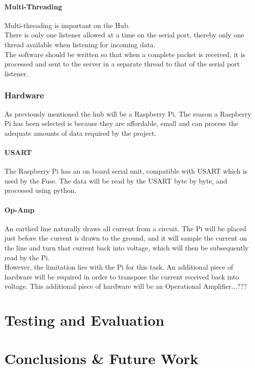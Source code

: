 \documentclass[draft,preprint,12pt,3p]{elsarticle}
\begin{document}
\paragraph{Multi-Threading}
Multi-threading is important on the Hub.\\
There is only one listener allowed at a time on the serial port, thereby only one thread available when listening for incoming data.\\
The software should be written so that when a complete packet is received, it is processed and sent to the server in a separate thread to that of the serial port listener.
\subsubsection{Hardware}
As previously mentioned the hub will be a Raspberry Pi. The reason a Raspberry Pi has been selected is because they are affordable, small and can process the adequate amounts of data required by the project.
\paragraph{USART}
The Raspberry Pi has an on board serial unit, compatible with USART which is used by the Fuse. The data will be read by the USART byte by byte, and processed using python.\\
\paragraph{Op-Amp}
An earthed line naturally draws all current from a circuit. The Pi will be placed just before the current is drawn to the ground, and it will sample the current on the line and turn that current back into voltage, which will then be subsequently read by the Pi.\\
However, the limitation lies with the Pi for this task. An additional piece of hardware will be required in order to transpose the current received back into voltage. This additional piece of hardware will be an Operational Amplifier...??? 


\section{Testing and Evaluation}


\section{Conclusions \& Future Work}

\clearpage

{}
\end{document}
